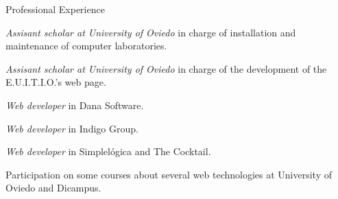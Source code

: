 
\begin{rubric}{Professional Experience}


  \entry*[2004-2005]
  \emph{Assisant scholar at University of Oviedo} in charge of installation and maintenance of computer laboratories.

  \entry*[2005-2006]
  \emph{Assisant scholar at University of Oviedo} in charge of the development of the E.U.I.T.I.O.'s web page.

  \entry*[2006-2007]
   \emph{Web developer} in Dana Software.

  \entry*[2008-2010]
   \emph{Web developer} in Indigo Group.

  \entry*[2008-??]
   \emph{Web developer} in Simplelógica and The Cocktail.


  \entry*[2008-2010]
  Participation on some courses about several web technologies at University of Oviedo and Dicampus.

\end{rubric}

